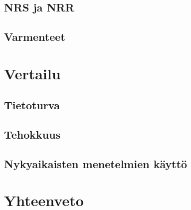 \documentclass[finnish]{tktltiki2}
\theoremstyle{definition}
\theoremstyle{remark}
\begin{document}
\subsection{NRS ja NRR}
\subsection{Varmenteet}

\section{Vertailu}
\subsection{Tietoturva}
\subsection{Tehokkuus}
\subsection{Nykyaikaisten menetelmien käyttö}

\section{Yhteenveto}  



%
%
%

\newpage






 
\end{document}

